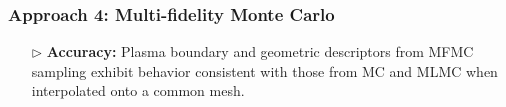 \documentclass{beamer}
\begin{document}
\begin{frame}[t]
    \frametitle{Approach 4: Multi-fidelity Monte Carlo}
\begin{itemize}[leftmargin=5pt] 
\item[$\triangleright$] \textcolor{myblue3}{\bf Accuracy:} 
{\footnotesize Plasma boundary and geometric descriptors from MFMC sampling exhibit behavior consistent with those from MC and MLMC when interpolated onto a common mesh.}
\begin{figure}[ht!]\centering
{}
\end{figure}
\end{itemize}
\end{frame}
\end{document}
